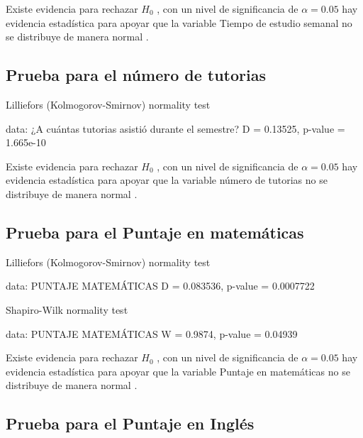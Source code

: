 \documentclass[
  man]{apa6}
\begin{document}
Existe evidencia para rechazar \(H_0\) , con un nivel de significancia de
\(\alpha=0.05\) hay evidencia estadística para apoyar que la variable
Tiempo de estudio semanal no se distribuye de manera normal .

\clearpage

\hypertarget{prueba-para-el-nuxfamero-de-tutorias}{%
\subsection{Prueba para el número de tutorias}\label{prueba-para-el-nuxfamero-de-tutorias}}

\begin{center}


    Lilliefors (Kolmogorov-Smirnov) normality test

data:  ¿A cuántas tutorias asistió durante el semestre?
D = 0.13525, p-value = 1.665e-10
\end{center}

Existe evidencia para rechazar \(H_0\) , con un nivel de significancia de
\(\alpha=0.05\) hay evidencia estadística para apoyar que la variable
número de tutorias no se distribuye de manera normal .

\hypertarget{prueba-para-el-puntaje-en-matemuxe1ticas}{%
\subsection{Prueba para el Puntaje en matemáticas}\label{prueba-para-el-puntaje-en-matemuxe1ticas}}

\begin{center}

    Lilliefors (Kolmogorov-Smirnov) normality test

data:  PUNTAJE MATEMÁTICAS
D = 0.083536, p-value = 0.0007722


    Shapiro-Wilk normality test

data:  PUNTAJE MATEMÁTICAS
W = 0.9874, p-value = 0.04939
\end{center}

Existe evidencia para rechazar \(H_0\) , con un nivel de significancia de
\(\alpha=0.05\) hay evidencia estadística para apoyar que la variable
Puntaje en matemáticas no se distribuye de manera normal .

\hypertarget{prueba-para-el-puntaje-en-ingluxe9s}{%
\subsection{Prueba para el Puntaje en Inglés}\label{prueba-para-el-puntaje-en-ingluxe9s}}
\end{document}
